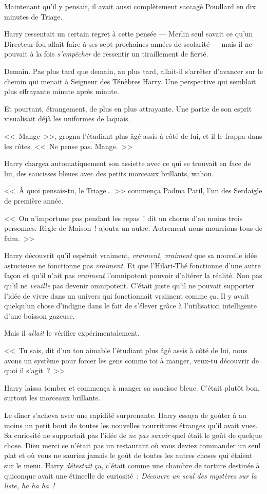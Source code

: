Maintenant qu'il y pensait, il avait aussi complètement saccagé Poudlard en dix minutes de Triage.

Harry ressentait un certain regret à cette pensée — Merlin seul savait ce qu'un Directeur fou allait faire à ses sept prochaines années de scolarité — mais il ne pouvait à la fois \emph{s'empêcher} de ressentir un tiraillement de fierté.

Demain. Pas plus tard que demain, au plus tard, allait-il s'arrêter d'avancer sur le chemin qui menait à Seigneur des Ténèbres Harry. Une perspective qui semblait plus effrayante minute après minute.

Et pourtant, étrangement, de plus en plus attrayante. Une partie de son esprit visualisait déjà les uniformes de laquais.

<<~Mange~>>, grogna l'étudiant plus âgé assis à côté de lui, et il le frappa dans les côtes. <<~Ne pense pas. Mange.~>>

Harry chargea automatiquement son assiette avec ce qui se trouvait en face de lui, des saucisses bleues avec des petits morceaux brillants, wahou.

<<~À quoi pensais-tu, le Triage…~>> commença Padma Patil, l'un des Serdaigle de première année.

<<~On n'importune pas pendant les repas~! dit un chorus d'au moins trois personnes. Règle de Maison~! ajouta un autre. Autrement nous mourrions tous de faim.~>>

Harry découvrit qu'il espérait vraiment, \emph{vraiment, vraiment} que sa nouvelle idée astucieuse ne fonctionne pas \emph{vraiment}. Et que l'Hilari-Thé fonctionne d'une autre façon et qu'il n'ait pas \emph{vraiment} l'omnipotent pouvoir d'altérer la réalité. Non pas qu'il ne \emph{veuille} pas devenir omnipotent. C'était juste qu'il ne pouvait supporter l'idée de vivre dans un univers qui fonctionnait vraiment comme ça. Il y avait quelqu'un chose d'indigne dans le fait de s'élever grâce à l'utilisation intelligente d'une boisson gazeuse.

Mais il \emph{allait} le vérifier expérimentalement.

<<~Tu sais, dit d'un ton aimable l'étudiant plus âgé assis à côté de lui, nous avons un système pour forcer les gens comme toi à manger, veux-tu découvrir de quoi il s'agit~?~>>

Harry laissa tomber et commença à manger sa saucisse bleue. C'était plutôt bon, surtout les morceaux brillants.

Le dîner s'acheva avec une rapidité surprenante. Harry essaya de goûter à au moins un petit bout de toutes les nouvelles nourritures étranges qu'il avait vues. Sa curiosité ne supportait pas l'idée de \emph{ne pas savoir} quel était le goût de quelque chose. Dieu merci ce n'était pas un restaurant où vous deviez commander un seul plat et où vous ne sauriez jamais le goût de toutes les autres choses qui étaient sur le menu. Harry \emph{détestait} ça, c'était comme une chambre de torture destinée à quiconque avait une étincelle de curiosité~: \emph{Découvre un seul des mystères sur la liste, ha ha ha~!}

